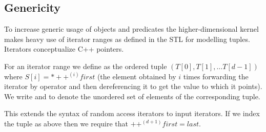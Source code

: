 \subsection{Genericity}

To increase generic usage of objects and predicates the
higher-dimensional kernel makes heavy use of iterator ranges as
defined in the STL for modelling tuples. Iterators conceptualize C++
pointers. 

For an iterator range \ccc{[first,last)} we define \ccc{T = tuple
  [first,last)} as the ordered tuple $(T[0],T[1], \ldots T[d-1])$
where $S[i] = *++^{(i)}\mathit{first}$ (the element obtained by $i$
times forwarding the iterator by operator \ccc{++} and then
dereferencing it to get the value to which it points).  We write \ccc{d
  = size [first,last)} and \ccc{S = set [first,last)} to denote the
unordered set of elements of the corresponding tuple.

This extends the syntax of random access iterators to input iterators.
If we index the tuple as above then we require that
$++^{(d+1)}\mathit{first} = \mathit{last}$.

